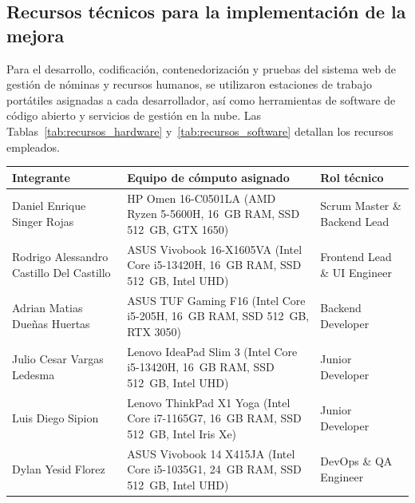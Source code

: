\subsection{Recursos técnicos para la implementación de la mejora}

Para el desarrollo, codificación, contenedorización y pruebas del sistema web de gestión de nóminas y recursos humanos, 
se utilizaron estaciones de trabajo portátiles asignadas a cada desarrollador, 
así como herramientas de software de código abierto y servicios de gestión en la nube. 
Las Tablas~\ref{tab:recursos_hardware} y~\ref{tab:recursos_software} detallan los recursos empleados.

\par
\noindent
\begin{minipage}{\linewidth}

    \begingroup
    \renewcommand{\baselinestretch}{1}
    \footnotesize
    \setlength{\tabcolsep}{4pt}
    \renewcommand{\arraystretch}{1.3}

    \begin{tabularx}{\linewidth}{@{}p{4.2cm}Xp{3.2cm}@{}}
        \toprule
        \textbf{Integrante} & \textbf{Equipo de cómputo asignado} & \textbf{Rol técnico} \\ \midrule
        Daniel Enrique Singer Rojas & HP Omen 16-C0501LA (AMD Ryzen 5-5600H, 16~GB RAM, SSD 512~GB, GTX 1650) & Scrum Master \& Backend Lead \\ \addlinespace
        Rodrigo Alessandro Castillo Del Castillo & ASUS Vivobook 16-X1605VA (Intel Core i5-13420H, 16~GB RAM, SSD 512~GB, Intel UHD) & Frontend Lead \& UI Engineer \\ \addlinespace
        Adrian Matias Dueñas Huertas & ASUS TUF Gaming F16 (Intel Core i5-205H, 16~GB RAM, SSD 512~GB, RTX 3050) & Backend Developer \\ \addlinespace
        Julio Cesar Vargas Ledesma & Lenovo IdeaPad Slim 3 (Intel Core i5-13420H, 16~GB RAM, SSD 512~GB, Intel UHD) & Junior Developer \\ \addlinespace
        Luis Diego Sipion & Lenovo ThinkPad X1 Yoga (Intel Core i7-1165G7, 16~GB RAM, SSD 512~GB, Intel Iris Xe) & Junior Developer \\ \addlinespace
        Dylan Yesid Florez & ASUS Vivobook 14 X415JA (Intel Core i5-1035G1, 24~GB RAM, SSD 512~GB, Intel UHD) & DevOps \& QA Engineer  \\ \bottomrule
    \end{tabularx}
    \endgroup

\end{minipage}
\finBloqueAPA

